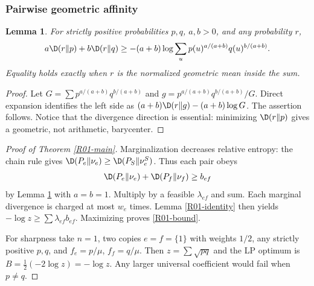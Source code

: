 \documentclass[11pt,a4paper]{article}
\newtheorem{lemma}[theorem]{Lemma}
\theoremstyle{definition}\newtheorem{definition}[theorem]{Definition}
\theoremstyle{remark}\newtheorem{remark}[theorem]{Remark}
\numberwithin{equation}{section}
\begin{document}
\subsubsection{Pairwise geometric affinity}
\begin{lemma}\label{R01-affinity}
For strictly positive probabilities $p,q$, $a,b>0$, and any probability $r$,
\begin{equation}\label{R01-geom}
a\D(r\Vert p)+b\D(r\Vert q)\geq
-(a+b)\log\sum_u p(u)^{a/(a+b)}q(u)^{b/(a+b)}.
\end{equation}
Equality holds exactly when $r$ is the normalized geometric mean inside the sum.
\end{lemma}
\begin{proof}
Let $G=\sum p^{a/(a+b)}q^{b/(a+b)}$ and $g=p^{a/(a+b)}q^{b/(a+b)}/G$. Direct expansion identifies the left side as $(a+b)\D(r\Vert g)-(a+b)\log G$. The assertion follows. Notice that the divergence direction is essential: minimizing $\D(r\Vert p)$ gives a geometric, not arithmetic, barycenter.
\end{proof}
\begin{proof}[Proof of Theorem \ref{R01-main}]
Marginalization decreases relative entropy: the chain rule gives $\D(P_e\Vert\nu_e)\geq\D(P_S\Vert\nu_e^S)$. Thus each pair obeys
\[
\D(P_e\Vert\nu_e)+\D(P_f\Vert\nu_f)\geq b_{ef}
\]
by Lemma \ref{R01-affinity} with $a=b=1$. Multiply by a feasible $\lambda_{ef}$ and sum. Each marginal divergence is charged at most $w_e$ times. Lemma \ref{R01-identity} then yields $-\log z\geq\sum\lambda_{ef}b_{ef}$. Maximizing proves \eqref{R01-bound}.

For sharpness take $n=1$, two copies $e=f=\{1\}$ with weights $1/2$, any strictly positive $p,q$, and $f_e=p/\mu$, $f_f=q/\mu$. Then $z=\sum\sqrt{pq}$ and the LP optimum is $B=\frac12(-2\log z)=-\log z$. Any larger universal coefficient would fail when $p\ne q$.
\end{proof}
\end{document}
